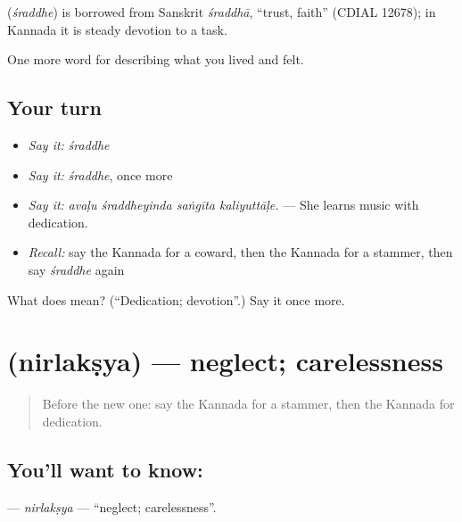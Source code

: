 \begin{cousinweb}
\textbf{} (\emph{śraddhe}) is borrowed from Sanskrit \emph{śraddhā}, \textquotedblleft{}trust, faith\textquotedblright{} (CDIAL 12678); in Kannada it is steady devotion to a task.
\end{cousinweb}

\begin{grammarlens}[title={What you've built}]
One more word for describing what you lived and felt.
\end{grammarlens}

\subsection*{Your turn}
\begin{itemize}
\raggedright
  \item \emph{Say it:} \emph{śraddhe}
  \item \emph{Say it:} \emph{śraddhe}, once more
  \item \emph{Say it:} \emph{avaḷu śraddheyinda saṅgīta kaliyuttāḷe.} — She learns music with dedication.
  \item \emph{Recall:} say the Kannada for a coward, then the Kannada for a stammer, then say \emph{śraddhe} again
\end{itemize}

\begin{tcolorbox}[breakable,colback=teal!4,colframe=teal!35!black,title={Before you move on}]
What does  mean? (\textquotedblleft{}Dedication; devotion\textquotedblright{}.) Say it once more.
\end{tcolorbox}
\section[\texorpdfstring{\kn{ನಿರ್ಲಕ್ಷ್ಯ} (nirlakṣya)}{ನಿರ್ಲಕ್ಷ್ಯ (nirlakṣya)}]{ (nirlakṣya) — neglect; carelessness}

\label{lesson:KA-C505-nirlaksya}



\begin{quote}
Before the new one: say the Kannada for a stammer, then the Kannada for dedication.
\end{quote}

\subsection*{You'll want to know: }
\textbf{} — \emph{nirlakṣya} — \textquotedblleft{}neglect; carelessness\textquotedblright{}.

